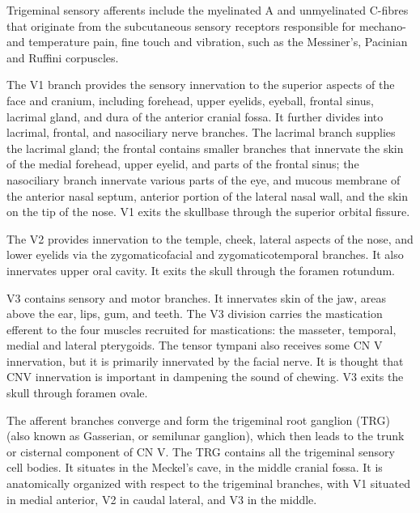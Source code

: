 Trigeminal sensory afferents include the myelinated A and unmyelinated C-fibres that originate from the subcutaneous sensory receptors responsible for mechano- and temperature pain, fine touch and vibration, such as the Messiner's, Pacinian and Ruffini corpuscles. 

The V1 branch provides the sensory innervation to the superior aspects of the face and cranium, including forehead, upper eyelids, eyeball, frontal sinus, lacrimal gland, and dura of the anterior cranial fossa. It further divides into lacrimal, frontal, and nasociliary nerve branches. The lacrimal branch supplies the lacrimal gland; the frontal contains smaller branches that innervate the skin of the medial forehead, upper eyelid, and parts of the frontal sinus; the nasociliary branch innervate various parts of the eye, and mucous membrane of the anterior nasal septum, anterior portion of the lateral nasal wall, and the skin on the tip of the nose. V1 exits the skullbase through the superior orbital fissure.  

The V2 provides innervation to the temple, cheek, lateral aspects of the nose, and lower eyelids via the zygomaticofacial and zygomaticotemporal branches. It also innervates upper oral cavity. It exits the skull through the foramen rotundum. 

V3 contains sensory and motor branches. It innervates skin of the jaw, areas above the ear, lips, gum, and teeth. The V3 division carries the mastication efferent to the four muscles recruited for mastications: the masseter, temporal, medial and lateral pterygoids. The tensor tympani also receives some CN V innervation, but it is primarily innervated by the facial nerve.  It is thought that CNV innervation is important in dampening the sound of chewing. V3 exits the skull through foramen ovale. 

The afferent branches converge and form the trigeminal root ganglion (TRG) (also known as Gasserian, or semilunar ganglion), which then leads to the trunk or cisternal component of CN V. The TRG contains all the trigeminal sensory cell bodies. It situates in the Meckel's cave, in the middle cranial fossa. It is anatomically organized with respect to the trigeminal branches, with V1 situated in medial anterior, V2 in caudal lateral, and V3 in the middle.

